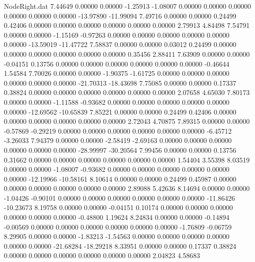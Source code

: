 \begin{filecontents}{NodeRight.dat}
   7.44649    0.00000    0.00000    -1.25913   -1.08007    0.00000    0.00000    0.00000    0.00000    0.00000    0.00000  -13.97890  -11.99094
   7.49716    0.00000    0.00000     0.24499    0.42406    0.00000    0.00000    0.00000    0.00000    0.00000    0.00000    2.79913    4.84498
   7.54791    0.00000    0.00000    -1.15169   -0.97263    0.00000    0.00000    0.00000    0.00000    0.00000    0.00000  -13.59019  -11.47722
   7.58837    0.00000    0.00000     0.03012    0.24499    0.00000    0.00000    0.00000    0.00000    0.00000    0.00000    0.35456    2.88411
   7.63909    0.00000    0.00000    -0.04151    0.13756    0.00000    0.00000    0.00000    0.00000    0.00000    0.00000   -0.46644    1.54584
   7.70026    0.00000    0.00000    -1.90375   -1.61725    0.00000    0.00000    0.00000    0.00000    0.00000    0.00000  -21.70313  -18.43698
   7.75085    0.00000    0.00000     0.17337    0.38824    0.00000    0.00000    0.00000    0.00000    0.00000    0.00000    2.07658    4.65030
   7.80173    0.00000    0.00000    -1.11588   -0.93682    0.00000    0.00000    0.00000    0.00000    0.00000    0.00000  -12.69562  -10.65839
   7.85221    0.00000    0.00000     0.24499    0.42406    0.00000    0.00000    0.00000    0.00000    0.00000    0.00000    2.72043    4.70875
   7.89315    0.00000    0.00000    -0.57869   -0.29219    0.00000    0.00000    0.00000    0.00000    0.00000    0.00000   -6.45712   -3.26033
   7.94379    0.00000    0.00000    -2.58419   -2.69163    0.00000    0.00000    0.00000    0.00000    0.00000    0.00000  -28.99997  -30.20564
   7.99456    0.00000    0.00000     0.13756    0.31662    0.00000    0.00000    0.00000    0.00000    0.00000    0.00000    1.54404    3.55398
   8.03519    0.00000    0.00000    -1.08007   -0.93682    0.00000    0.00000    0.00000    0.00000    0.00000    0.00000  -12.19966  -10.58161
   8.10614    0.00000    0.00000     0.24499    0.45987    0.00000    0.00000    0.00000    0.00000    0.00000    0.00000    2.89088    5.42636
   8.14694    0.00000    0.00000    -1.04426   -0.90101    0.00000    0.00000    0.00000    0.00000    0.00000    0.00000  -11.86426  -10.23673
   8.19758    0.00000    0.00000    -0.04151    0.10174    0.00000    0.00000    0.00000    0.00000    0.00000    0.00000   -0.48800    1.19624
   8.24834    0.00000    0.00000    -0.14894   -0.00569    0.00000    0.00000    0.00000    0.00000    0.00000    0.00000   -1.76809   -0.06759
   8.29905    0.00000    0.00000    -1.83213   -1.54563    0.00000    0.00000    0.00000    0.00000    0.00000    0.00000  -21.68284  -18.29218
   8.33951    0.00000    0.00000     0.17337    0.38824    0.00000    0.00000    0.00000    0.00000    0.00000    0.00000    2.04823    4.58683

\end{filecontents}
